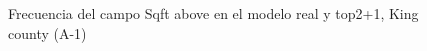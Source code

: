 \begin{figure}[H]
    \centering
    
    \caption{Frecuencia del campo Sqft above en el modelo real y top2+1, King county (A-1)}
    \label{frecuency-top2+1-sqft above}
\end{figure}